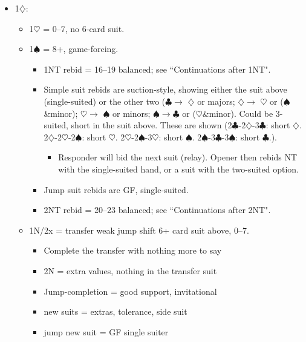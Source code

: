 \documentclass[a4paper,12pt]{article}
\begin{document}
\begin{itemize}
\item 1$\diamondsuit$:
	\begin{itemize}
   \item 1$\heartsuit$ = 0--7, no 6-card suit.
   \item 1$\spadesuit$ = 8+, game-forcing.
		\begin{itemize}
      \item 1NT rebid = 16--19 balanced; see ``Continuations after 1NT".
      \item Simple suit rebids are suction-style, showing either the suit above
         (single-suited) or the other two ($\clubsuit$$\rightarrow$ $\diamondsuit$ or majors; $\diamondsuit$$\rightarrow$ $\heartsuit$ or ($\spadesuit$\&minor); $\heartsuit$$\rightarrow$
         $\spadesuit$ or minors; $\spadesuit$$\rightarrow$$\clubsuit$ or ($\heartsuit$\&minor). Could be 3-suited, short in the suit
         above. These are shown (2$\clubsuit$-2$\diamondsuit$-3$\clubsuit$: short $\diamondsuit$. 2$\diamondsuit$-2$\heartsuit$-2$\spadesuit$: short $\heartsuit$. 2$\heartsuit$-2$\spadesuit$-3$\heartsuit$:
         short $\spadesuit$. 2$\spadesuit$-3$\clubsuit$-3$\spadesuit$: short $\clubsuit$.).
			\begin{itemize}
			\item Responder will bid the next suit (relay). Opener then rebids NT with the
				single-suited hand, or a suit with the two-suited option.
			\end{itemize}
      \item Jump suit rebids are GF, single-suited.
      \item 2NT rebid = 20--23 balanced; see ``Continuations after 2NT".
		\end{itemize}
   \item 1N/2x = transfer weak jump shift 6+ card suit above, 0--7.
		\begin{itemize}
		\item Complete the transfer with nothing more to say
		\item 2N = extra values, nothing in the transfer suit
		\item Jump-completion = good support, invitational
		\item new suits = extras, tolerance, side suit
		\item jump new suit = GF single suiter
		\end{itemize}
	\end{itemize}


\end{itemize}
\end{document}
